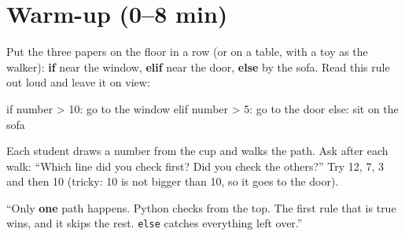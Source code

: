 \section{Warm-up (0--8 min)}
\begin{unplugged}
Put the three papers on the floor in a row (or on a table, with a toy as the walker): \textbf{if} near the window, \textbf{elif} near the door, \textbf{else} by the sofa. Read this rule out loud and leave it on view:
\begin{pycode}
if number > 10:
    go to the window
elif number > 5:
    go to the door
else:
    sit on the sofa
\end{pycode}
Each student draws a number from the cup and walks the path. Ask after each walk: \enquote{Which line did you check first? Did you check the others?} Try 12, 7, 3 and then 10 (tricky: 10 is not bigger than 10, so it goes to the door).
\end{unplugged}
\begin{teacherscript}
\enquote{Only \textbf{one} path happens. Python checks from the top. The first rule that is true wins, and it skips the rest. \texttt{else} catches everything left over.}
\end{teacherscript}


